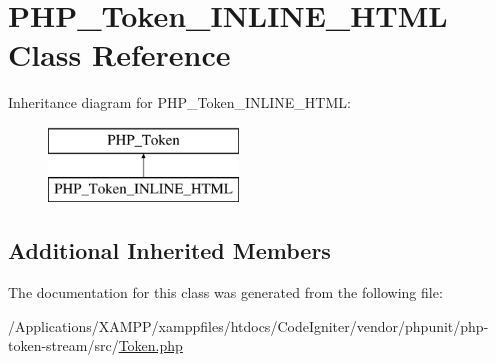 \hypertarget{class_p_h_p___token___i_n_l_i_n_e___h_t_m_l}{}\section{P\+H\+P\+\_\+\+Token\+\_\+\+I\+N\+L\+I\+N\+E\+\_\+\+H\+T\+ML Class Reference}
\label{class_p_h_p___token___i_n_l_i_n_e___h_t_m_l}
Inheritance diagram for P\+H\+P\+\_\+\+Token\+\_\+\+I\+N\+L\+I\+N\+E\+\_\+\+H\+T\+ML\+:\begin{figure}[H]
\begin{center}
\leavevmode
\includegraphics[height=2.000000cm]{class_p_h_p___token___i_n_l_i_n_e___h_t_m_l}
\end{center}
\end{figure}
\subsection*{Additional Inherited Members}


The documentation for this class was generated from the following file\+:\begin{DoxyCompactItemize}
\item 
/\+Applications/\+X\+A\+M\+P\+P/xamppfiles/htdocs/\+Code\+Igniter/vendor/phpunit/php-\/token-\/stream/src/\mbox{\hyperlink{_token_8php}{Token.\+php}}\end{DoxyCompactItemize}

